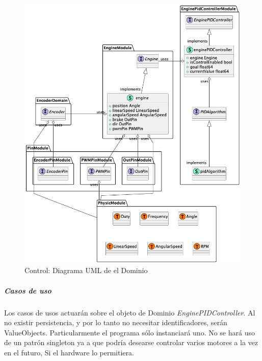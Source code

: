 \begin{figure}[H]
    \centering
    \includegraphics[height=0.6\textheight]{./part/Proyecto_ejecutivo/memoria_descriptiva/descripcionDelProyecto/control/uml/controlDomain}
    \caption{Control: Diagrama UML de el Dominio}\label{fig:Control-Diagrama UML de el Dominio}
\end{figure}

\subparagraph{Casos de uso}

Los casos de usos actuarán sobre el objeto de Dominio \textit{EnginePIDController}.
Al no existir persistencia, y por lo tanto no necesitar identificadores, serán ValueObjects.
Particularmente el programa sólo instanciará uno.
No se hará uso de un patrón singleton ya a que podría desearse controlar varios motores a la vez en el futuro, Si el hardware lo permitiera.

